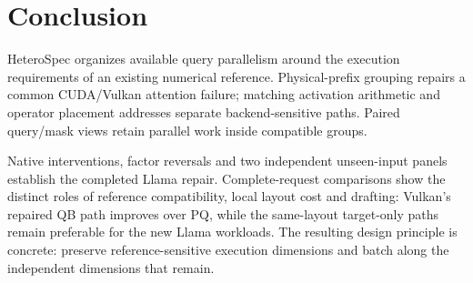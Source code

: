 \section{Conclusion}
HeteroSpec organizes available query parallelism around the execution requirements of an existing numerical reference. Physical-prefix grouping repairs a common CUDA/Vulkan attention failure; matching activation arithmetic and operator placement addresses separate backend-sensitive paths. Paired query/mask views retain parallel work inside compatible groups.

Native interventions, factor reversals and two independent unseen-input panels establish the completed Llama repair. Complete-request comparisons show the distinct roles of reference compatibility, local layout cost and drafting: Vulkan's repaired QB path improves over PQ, while the same-layout target-only paths remain preferable for the new Llama workloads. The resulting design principle is concrete: preserve reference-sensitive execution dimensions and batch along the independent dimensions that remain.
